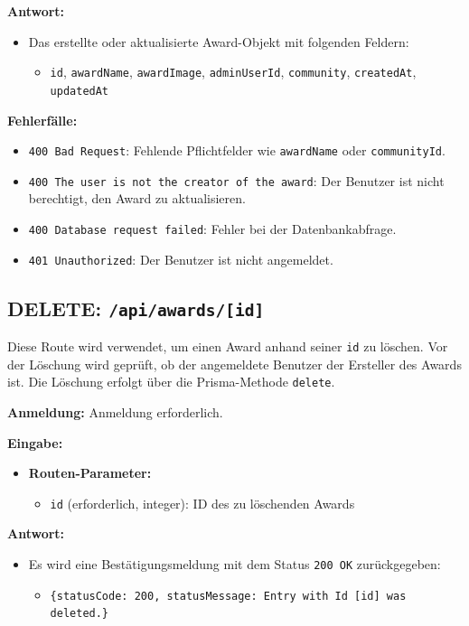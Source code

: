 \documentclass[a4paper,12pt]{article}
\begin{document}
\textbf{Antwort:}
\begin{itemize}
    \item Das erstellte oder aktualisierte Award-Objekt mit folgenden Feldern:
    \begin{itemize}
        \item \texttt{id}, \texttt{awardName}, \texttt{awardImage}, \texttt{adminUserId}, \texttt{community}, \texttt{createdAt}, \texttt{updatedAt}
    \end{itemize}
\end{itemize}

\textbf{Fehlerfälle:}
\begin{itemize}
    \item \texttt{400 Bad Request}: Fehlende Pflichtfelder wie \texttt{awardName} oder \texttt{communityId}.
    \item \texttt{400 The user is not the creator of the award}: Der Benutzer ist nicht berechtigt, den Award zu aktualisieren.
    \item \texttt{400 Database request failed}: Fehler bei der Datenbankabfrage.
    \item \texttt{401 Unauthorized}: Der Benutzer ist nicht angemeldet.
\end{itemize}

\newpage
\subsection{DELETE: \texttt{/api/awards/[id]}}

Diese Route wird verwendet, um einen Award anhand seiner \texttt{id} zu löschen. Vor der Löschung wird geprüft, ob der angemeldete Benutzer der Ersteller des Awards ist. Die Löschung erfolgt über die Prisma-Methode \texttt{delete}.

\textbf{Anmeldung:} Anmeldung erforderlich.

\textbf{Eingabe:}
\begin{itemize}
    \item \textbf{Routen-Parameter:}
    \begin{itemize}
        \item \texttt{id} (erforderlich, integer): ID des zu löschenden Awards
    \end{itemize}
\end{itemize}

\textbf{Antwort:}
\begin{itemize}
    \item Es wird eine Bestätigungsmeldung mit dem Status \texttt{200 OK} zurückgegeben:
    \begin{itemize}
        \item \texttt{\{statusCode: 200, statusMessage: Entry with Id [id] was deleted.\}}
    \end{itemize}
\end{itemize}
\end{document}
